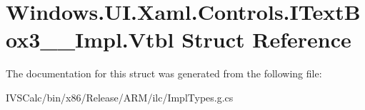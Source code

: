 \hypertarget{struct_windows_1_1_u_i_1_1_xaml_1_1_controls_1_1_i_text_box3_____impl_1_1_vtbl}{}\section{Windows.\+U\+I.\+Xaml.\+Controls.\+I\+Text\+Box3\+\_\+\+\_\+\+Impl.\+Vtbl Struct Reference}
\label{struct_windows_1_1_u_i_1_1_xaml_1_1_controls_1_1_i_text_box3_____impl_1_1_vtbl}


The documentation for this struct was generated from the following file\+:\begin{DoxyCompactItemize}
\item 
I\+V\+S\+Calc/bin/x86/\+Release/\+A\+R\+M/ilc/Impl\+Types.\+g.\+cs\end{DoxyCompactItemize}
